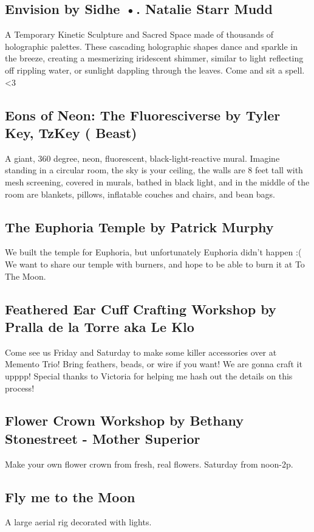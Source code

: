 \begin{multicols}{2}
\subsection*{Envision by Sidhe •. Natalie Starr Mudd                }
A Temporary Kinetic Sculpture and Sacred Space made of thousands of holographic palettes. These cascading holographic shapes dance and sparkle in the breeze, creating a mesmerizing iridescent shimmer, similar to light reflecting off rippling water, or sunlight dappling through the leaves. Come and sit a spell. <3        


\subsection*{Eons of Neon: The Fluoresciverse by Tyler Key, TzKey ( Beast)                 }
A giant, 360 degree, neon, fluorescent, black-light-reactive mural. Imagine standing in a circular room, the sky is your ceiling, the walls are 8 feet tall with mesh screening, covered in murals, bathed in black light, and in the middle of the room are blankets, pillows, inflatable couches and chairs, and bean bags.


\subsection*{The Euphoria Temple by Patrick Murphy        }
        We built the temple for Euphoria, but unfortunately Euphoria didn't happen :( We         want to share our temple with burners, and hope to be able to burn it at To The         Moon.        


\subsection*{Feathered Ear Cuff Crafting Workshop by Pralla de la Torre aka Le Klo                }
Come see us Friday and Saturday to make some killer accessories over at Memento Trio! Bring feathers, beads, or wire if you want! We are gonna craft it upppp! Special thanks to Victoria for helping me hash out the details on this process!


\subsection*{Flower Crown Workshop by Bethany Stonestreet - Mother Superior        }
        Make your own flower crown from fresh, real flowers. Saturday from noon-2p.


\subsection*{Fly me to the Moon }
        A large aerial rig decorated with lights.        



\end{multicols}
